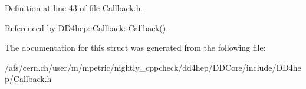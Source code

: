 Definition at line 43 of file Callback.h.

Referenced by DD4hep::Callback::Callback().

The documentation for this struct was generated from the following file:\begin{DoxyCompactItemize}
\item 
/afs/cern.ch/user/m/mpetric/nightly\_\-cppcheck/dd4hep/DDCore/include/DD4hep/\hyperlink{_callback_8h}{Callback.h}\end{DoxyCompactItemize}
